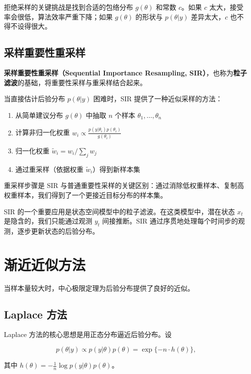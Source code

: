 拒绝采样的关键挑战是找到合适的包络分布 $g(\theta)$ 和常数 $c$。如果 $c$ 太大，接受率会很低，算法效率严重下降；如果 $g(\theta)$ 的形状与 $p(\theta | y)$ 差异太大，$c$ 也不得不设得很大。

\subsection{采样重要性重采样}

\textbf{采样重要性重采样（Sequential Importance Resampling, SIR）}，也称为\textbf{粒子滤波}的基础，将重要性采样与重采样结合起来。

当直接估计后验分布 $p(\theta | y)$ 困难时，SIR 提供了一种近似采样的方法：

\begin{enumerate}
  \item 从简单建议分布 $g(\theta)$ 中抽取 $n$ 个样本 $\theta_1, \ldots, \theta_n$
  \item 计算非归一化权重 $w_i \propto \frac{p(y | \theta_i) p(\theta_i)}{g(\theta_i)}$
  \item 归一化权重 $\tilde{w}_i = w_i / \sum_j w_j$
  \item 通过重采样（依据权重 $\tilde{w}_i$）得到新样本集
\end{enumerate}

重采样步骤是 SIR 与普通重要性采样的关键区别：通过消除低权重样本、复制高权重样本，我们得到了一个更接近目标分布的样本集。

\begin{Remark}
  SIR 的一个重要应用是状态空间模型中的粒子滤波。在这类模型中，潜在状态 $x_t$ 是隐含的，我们只能通过观测 $y_t$ 间接推断。SIR 通过序贯地处理每个时间步的观测，逐步更新状态的后验分布。
\end{Remark}

\section{渐近近似方法}

当样本量较大时，中心极限定理为后验分布提供了良好的近似。

\subsection{Laplace 方法}

Laplace 方法的核心思想是用正态分布逼近后验分布。设

\[
p(\theta | y) \propto p(y | \theta) p(\theta) = \exp\{-n \cdot h(\theta)\},
\]

其中 $h(\theta) = -\frac{1}{n} \log p(y | \theta) p(\theta)$。

